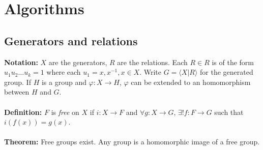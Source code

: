 \chapter{Algorithms}
\section {Generators and relations}
{\bf Notation:} $X$ are the generators, $R$ are the relations.  Each $R \in R$ is
of the form $u_1 u_2 \ldots u_k =1$ where each $u_1= x, x^{-1}, x \in X$.  Write
$G= \langle X|R \rangle $ for the generated group.
If $H$ is a group and $\varphi: X \rightarrow H$,
$\varphi$ can be extended to an homomorphism between $H$ and $G$.
\\
\\
{\bf Definition:} $F$ is \emph{free} on $X$ if $i: X \rightarrow F$ and
$\forall g: X \rightarrow G$, $\exists ! f:F \rightarrow G$ such that
$i(f(x))=g(x)$.
\\
\\
{\bf Theorem:} Free groups exist.  Any group is a homomorphic image of a free group.

